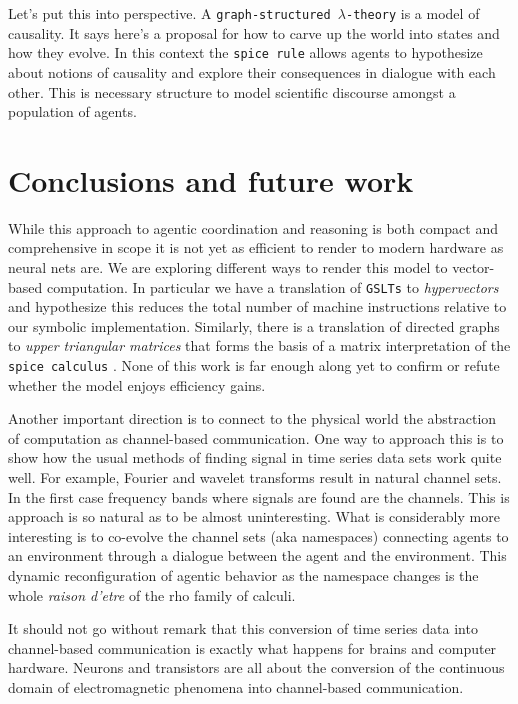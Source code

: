 \documentclass{article}
\newcommand{\code}[1]{\texttt{#1}}
\begin{document}
\medskip

Let's put this into perspective. A \code{graph-structured $\lambda$-theory} is a model of causality. It says here's a proposal for how to carve up the world into states and how they evolve. In this context the \code{spice rule} allows agents to hypothesize about notions of causality and explore their consequences in dialogue with each other. This is necessary structure to model scientific discourse amongst a population of agents.

\section{Conclusions and future work}

While this approach to agentic coordination and reasoning is both compact and comprehensive in scope it is not yet as efficient to render to modern hardware as neural nets are. We are exploring different ways to render this model to vector-based computation. In particular we have a translation of \code{GSLTs} to \emph{hypervectors} \cite{DBLP:journals/cogcom/Kanerva09} and hypothesize this reduces the total number of machine instructions relative to our symbolic implementation. Similarly, there is a translation of directed graphs to \emph{upper triangular matrices} that forms the basis of a matrix interpretation of the \code{spice calculus} \cite{DBLP:journals/corr/abs-2301-08181}. None of this work is far enough along yet to confirm or refute whether the model enjoys efficiency gains.

Another important direction is to connect to the physical world the abstraction of computation as channel-based communication. One way to approach this is to show how the usual methods of finding signal in time series data sets work quite well. For example, Fourier and wavelet transforms result in natural channel sets. In the first case frequency bands where signals are found are the channels. This is approach is so natural as to be almost uninteresting. What is considerably more interesting is to co-evolve the channel sets (aka namespaces) connecting agents to an environment through a dialogue between the agent and the environment. This dynamic reconfiguration of agentic behavior as the namespace changes is the whole \emph{raison d'etre} of the rho family of calculi.

It should not go without remark that this conversion of time series data into channel-based communication is exactly what happens for brains and computer hardware. Neurons and transistors are all about the conversion of the continuous domain of electromagnetic phenomena into channel-based communication.

   

\end{document}
